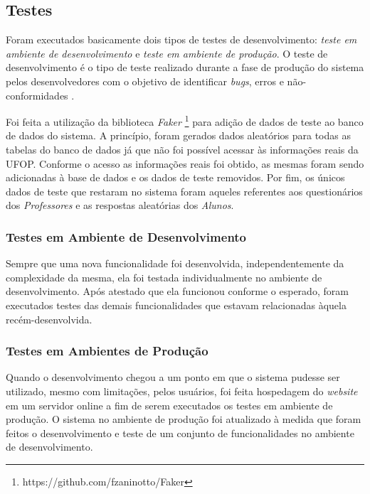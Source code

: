 \documentclass[
  12pt,       %
  openright,      %
  oneside,      %
  a4paper,      %
  english,      %
  french,        %
  spanish,     %
  brazil        %
  ]{abntex2-decsi}
\begin{document}
        \subsection{Testes}

        Foram executados basicamente dois tipos de testes de desenvolvimento: \textit{teste em ambiente de desenvolvimento} e \textit{teste em ambiente de produção}. O teste de desenvolvimento é o tipo de teste realizado durante a fase de produção do sistema pelos desenvolvedores com o objetivo de identificar \textit{bugs}, erros e não-conformidades \cite[p. 210]{sommervile:2011}.

           Foi feita a utilização da biblioteca \textit{Faker} \footnote{https://github.com/fzaninotto/Faker} para adição de dados de teste ao banco de dados do sistema. A princípio, foram gerados dados aleatórios para todas as tabelas do banco de dados já que não foi possível acessar às informações reais da UFOP. Conforme o acesso as informações reais foi obtido, as mesmas foram sendo adicionadas à base de dados e os dados de teste removidos. Por fim, os únicos dados de teste que restaram no sistema foram aqueles referentes aos questionários dos \textit{Professores} e as respostas aleatórias dos \textit{Alunos}. 
       
			\subsubsection{Testes em Ambiente de Desenvolvimento}

			Sempre que uma nova funcionalidade foi desenvolvida, independentemente da complexidade da mesma, ela foi testada individualmente no ambiente de desenvolvimento. Após atestado que ela funcionou conforme o esperado, foram executados testes das demais funcionalidades que estavam relacionadas àquela recém-desenvolvida.
           
			\subsubsection{Testes em Ambientes de Produção}
       
       		Quando o desenvolvimento chegou a um ponto em que o sistema pudesse ser utilizado, mesmo com limitações, pelos usuários, foi feita hospedagem do \textit{website} em um servidor online a fim de serem executados os testes em ambiente de produção. O sistema no ambiente de produção foi atualizado à medida que foram feitos o desenvolvimento e teste de um conjunto de funcionalidades no ambiente de desenvolvimento.
            
\end{document}
